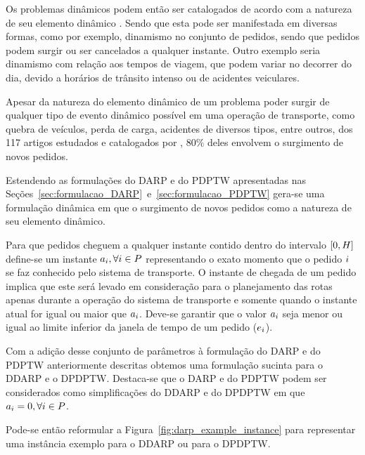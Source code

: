 Os problemas dinâmicos podem então ser catalogados de acordo com a natureza de
seu elemento dinâmico \cite{psaraftis_dynamic_2015}.
Sendo que esta pode ser manifestada em diversas formas, como por exemplo,
dinamismo no conjunto de pedidos, sendo que pedidos podem surgir ou ser
cancelados a qualquer instante.
Outro exemplo seria dinamismo com relação aos tempos de viagem, que podem
variar no decorrer do dia, devido a horários de trânsito intenso ou de
acidentes veiculares.

Apesar da natureza do elemento dinâmico de um problema poder surgir de qualquer
tipo de evento dinâmico possível em uma operação de transporte, como quebra de
veículos, perda de carga, acidentes de diversos tipos, entre outros, dos 117
artigos estudados e catalogados por  \textcite{psaraftis_dynamic_2015}, 80\%
deles envolvem o surgimento de novos pedidos.

Estendendo as formulações do DARP e do PDPTW apresentadas nas
Seções~\ref{sec:formulacao_DARP}~e~\ref{sec:formulacao_PDPTW} gera-se uma
formulação dinâmica em que o surgimento de novos pedidos como a natureza de 
seu elemento dinâmico.

Para que pedidos cheguem a qualquer instante contido dentro
do intervalo $[0, H]$ define-se um instante 
$a_i, \forall i \in P$ representando 
o exato momento que o pedido $i$ se faz conhecido pelo sistema de 
transporte.
O instante de chegada de um pedido implica que este será levado
em consideração para o planejamento das rotas apenas durante a
operação do sistema de transporte e somente quando o instante atual for
igual ou maior que $a_i$.
Deve-se garantir que o valor $a_i$ seja menor ou igual ao 
limite inferior da janela de tempo de um pedido 
($e_i$).

Com a adição desse conjunto de parâmetros à formulação do DARP e do PDPTW
anteriormente descritas obtemos uma formulação sucinta para o DDARP e o DPDPTW.
Destaca-se que o DARP e do PDPTW podem ser considerados como simplificações do
DDARP e do DPDPTW em que $a_i = 0, \forall i \in
P$.

Pode-se então reformular a Figura~\ref{fig:darp_example_instance} para
representar uma instância exemplo para o DDARP ou para o DPDPTW.

